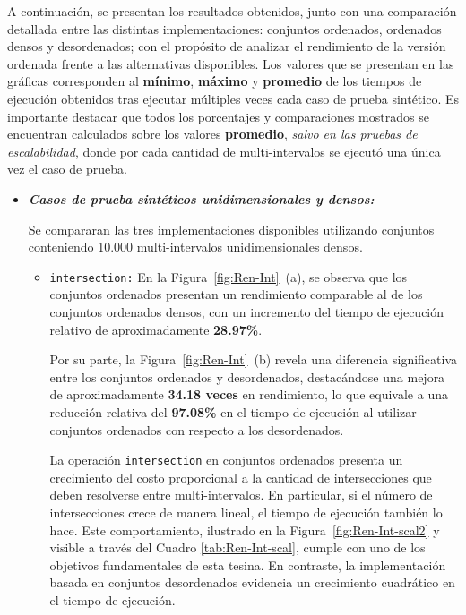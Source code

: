 A continuación, se presentan los resultados obtenidos, junto con una comparación detallada entre las distintas implementaciones: conjuntos ordenados, ordenados densos y desordenados; con el propósito de analizar el rendimiento de la versión ordenada frente a las alternativas disponibles. Los valores que se presentan en las gráficas corresponden al \textbf{mínimo}, \textbf{máximo} y \textbf{promedio} de los tiempos de ejecución obtenidos tras ejecutar múltiples veces cada caso de prueba sintético. Es importante destacar que todos los porcentajes y comparaciones mostrados se encuentran calculados sobre los valores \textbf{promedio}, \textit{salvo en las pruebas de escalabilidad}, donde por cada cantidad de multi-intervalos se ejecutó una única vez el caso de prueba.



\begin{itemize}
    \item \textbf{\textit{Casos de prueba sintéticos unidimensionales y densos:}}

    Se compararan las tres implementaciones disponibles utilizando conjuntos conteniendo 10.000 multi-intervalos unidimensionales densos.

    \begin{itemize}
        \item \texttt{intersection:} 
        En la Figura~\ref{fig:Ren-Int}~(a), se observa que los conjuntos ordenados presentan un rendimiento comparable al de los conjuntos ordenados densos, con un incremento del tiempo de ejecución relativo de aproximadamente \textbf{28{.}97\%}.

        Por su parte, la Figura~\ref{fig:Ren-Int}~(b) revela una diferencia significativa entre los conjuntos ordenados y desordenados, destacándose una mejora de aproximadamente \textbf{34{.}18 veces} en rendimiento, lo que equivale a una reducción relativa del \textbf{97{.}08\%} en el tiempo de ejecución al utilizar conjuntos ordenados con respecto a los desordenados.

        La operación \texttt{intersection} en conjuntos ordenados presenta un crecimiento del costo proporcional a la cantidad de intersecciones que deben resolverse entre multi-intervalos. En particular, si el número de intersecciones crece de manera lineal, el tiempo de ejecución también lo hace. Este comportamiento, ilustrado en la Figura~\ref{fig:Ren-Int-scal2} y visible a través del Cuadro \ref{tab:Ren-Int-scal}, cumple con uno de los objetivos fundamentales de esta tesina. En contraste, la implementación basada en conjuntos desordenados evidencia un crecimiento cuadrático en el tiempo de ejecución.



\end{itemize}
\end{itemize}
